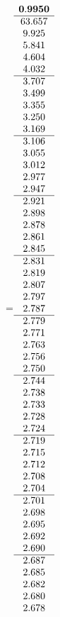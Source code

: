 =\hbox{$\begin{array}{c}
\bf 0.9950 
 \\ \hline 
  63.657 \\ 
   9.925 \\ 
   5.841 \\ 
   4.604 \\ 
   4.032
 \\ \hline 
   3.707 \\ 
   3.499 \\ 
   3.355 \\ 
   3.250 \\ 
   3.169
 \\ \hline 
   3.106 \\ 
   3.055 \\ 
   3.012 \\ 
   2.977 \\ 
   2.947
 \\ \hline 
   2.921 \\ 
   2.898 \\ 
   2.878 \\ 
   2.861 \\ 
   2.845
 \\ \hline 
   2.831 \\ 
   2.819 \\ 
   2.807 \\ 
   2.797 \\ 
   2.787
 \\ \hline 
   2.779 \\ 
   2.771 \\ 
   2.763 \\ 
   2.756 \\ 
   2.750
 \\ \hline 
   2.744 \\ 
   2.738 \\ 
   2.733 \\ 
   2.728 \\ 
   2.724
 \\ \hline 
   2.719 \\ 
   2.715 \\ 
   2.712 \\ 
   2.708 \\ 
   2.704
 \\ \hline 
   2.701 \\ 
   2.698 \\ 
   2.695 \\ 
   2.692 \\ 
   2.690
 \\ \hline 
   2.687 \\ 
   2.685 \\ 
   2.682 \\ 
   2.680 \\ 
   2.678
 \end{array}$}
